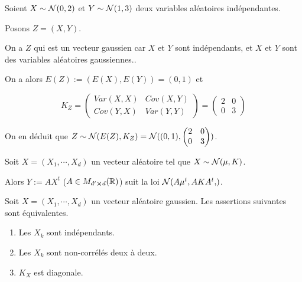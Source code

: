 \begin{exemple}
	Soient $X \sim \mathcal{N}(0, 2)$ et $Y \sim \mathcal{N}(1, 3)$
	deux variables aléatoires indépendantes.

	Posons $Z = (X, Y)$.

	On a $Z$ qui est un vecteur gaussien car $X$ et $Y$ sont indépendants, et
	$X$ et $Y$ sont des variables aléatoires gaussiennes..

	On a alors $E(Z) := (E(X), E(Y)) = (0, 1)$ et

	\begin{equation}
		K_{Z} =
		\begin{pmatrix}
			Var(X, X) & Cov(X, Y) \\
			Cov(Y, X) & Var(Y, Y)
		\end{pmatrix}
		=
		\begin{pmatrix}
			2 & 0 \\
			0 & 3
		\end{pmatrix}
	\end{equation}

	On en déduit que $Z \sim \mathcal{N}(E(Z), K_{Z}) = \mathcal{N}((0,
	1), \begin{pmatrix}
			2 & 0 \\
			0 & 3
		\end{pmatrix}
	)$.
\end{exemple}

\begin{proposition}
	Soit $X = (X_{1}, \cdots, X_{d})$ un vecteur aléatoire tel que $X \sim
	\mathcal{N}(\mu, K)$.

	Alors $Y := A X^{t}$ ($A \in M_{d' \cross d}(\mathbb{R})$) suit la
	loi $\lawNormal{A \mu^{t},  A K A^{t}}$.
\end{proposition}

\begin{theorem}
	Soit $X = (X_{1}, \cdots, X_{d})$ un vecteur aléatoire gaussien.
	Les assertions suivantes sont équivalentes.

	\begin{enumerate}
		\item Les $X_{k}$ sont indépendants.
		\item Les $X_{k}$ sont non-corrélés deux à deux.
		\item $K_{X}$ est diagonale.
	\end{enumerate}
\end{theorem}
